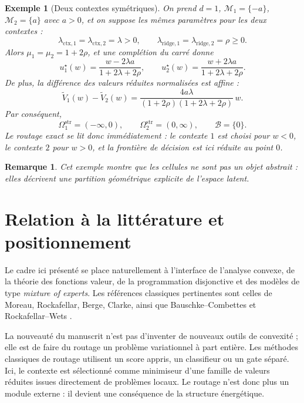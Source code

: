 \documentclass[11pt,a4paper]{article}
\newtheorem{remark}{Remarque}[section]
\newtheorem{example}{Exemple}[section]
\newcommand{\Mcal}{\mathcal M}
\newcommand{\Bcal}{\mathcal B}
\begin{document}
\begin{example}[Deux contextes symétriques]
On prend \(d=1\), \(\Mcal_1=\{-a\}\), \(\Mcal_2=\{a\}\) avec \(a>0\), et on suppose les mêmes paramètres pour les deux contextes :
\[
\lambda_{\mathrm{ctx},1}=\lambda_{\mathrm{ctx},2}=\lambda>0,
\qquad
\lambda_{\mathrm{ridge},1}=\lambda_{\mathrm{ridge},2}=\rho\ge 0.
\]
Alors \(\mu_1=\mu_2=1+2\rho\), et une complétion du carré donne
\[
u_1^\star(w)=\frac{w-2\lambda a}{1+2\lambda+2\rho},
\qquad
u_2^\star(w)=\frac{w+2\lambda a}{1+2\lambda+2\rho}.
\]
De plus, la différence des valeurs réduites normalisées est affine :
\[
\widetilde V_1(w)-\widetilde V_2(w)
=
\frac{4a\lambda}{(1+2\rho)(1+2\lambda+2\rho)}\,w.
\]
Par conséquent,
\[
\Omega_1^{\mathrm{str}}=(-\infty,0),
\qquad
\Omega_2^{\mathrm{str}}=(0,\infty),
\qquad
\Bcal=\{0\}.
\]
Le routage exact se lit donc immédiatement : le contexte \(1\) est choisi pour \(w<0\), le contexte \(2\) pour \(w>0\), et la frontière de décision est ici réduite au point \(0\).
\end{example}

\begin{remark}
Cet exemple montre que les cellules ne sont pas un objet abstrait : elles décrivent une partition géométrique explicite de l'espace latent.
\end{remark}

\section{Relation à la littérature et positionnement}

Le cadre ici présenté se place naturellement à l'interface de l'analyse convexe, de la théorie des fonctions valeur, de la programmation disjonctive et des modèles de type \emph{mixture of experts}. Les références classiques pertinentes sont celles de Moreau, Rockafellar, Berge, Clarke, ainsi que Bauschke--Combettes et Rockafellar--Wets \cite{Moreau1965,Rockafellar1970,Berge1963,Clarke1983,BauschkeCombettes2017,RockafellarWets1998}.

La nouveauté du manuscrit n'est pas d'inventer de nouveaux outils de convexité ; elle est de faire du routage un problème variationnel à part entière. Les méthodes classiques de routage utilisent un score appris, un classifieur ou un gate séparé. Ici, le contexte est sélectionné comme minimiseur d'une famille de valeurs réduites issues directement de problèmes locaux. Le routage n'est donc plus un module externe : il devient une conséquence de la structure énergétique.
\end{document}
